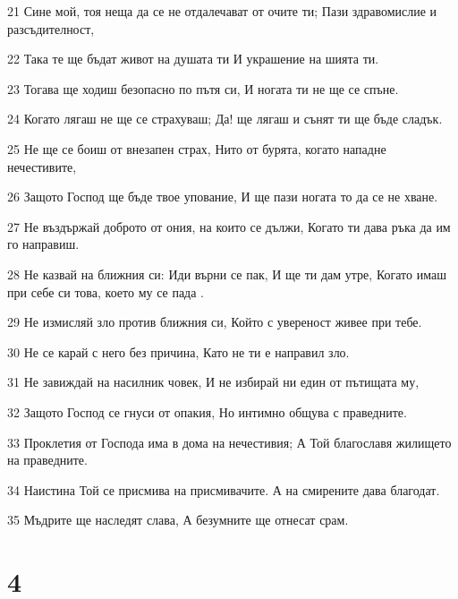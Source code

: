\par 21 Сине мой, тоя неща да се не отдалечават от очите ти; Пази здравомислие и разсъдителност,
\par 22 Така те ще бъдат живот на душата ти И украшение на шията ти.
\par 23 Тогава ще ходиш безопасно по пътя си, И ногата ти не ще се спъне.
\par 24 Когато лягаш не ще се страхуваш; Да! ще лягаш и сънят ти ще бъде сладък.
\par 25 Не ще се боиш от внезапен страх, Нито от бурята, когато нападне нечестивите,
\par 26 Защото Господ ще бъде твое упование, И ще пази ногата то да се не хване.
\par 27 Не въздържай доброто от ония, на които се дължи, Когато ти дава ръка да им го направиш.
\par 28 Не казвай на ближния си: Иди върни се пак, И ще ти дам утре, Когато имаш при себе си това, което му се пада .
\par 29 Не измисляй зло против ближния си, Който с увереност живее при тебе.
\par 30 Не се карай с него без причина, Като не ти е направил зло.
\par 31 Не завиждай на насилник човек, И не избирай ни един от пътищата му,
\par 32 Защото Господ се гнуси от опакия, Но интимно общува с праведните.
\par 33 Проклетия от Господа има в дома на нечестивия; А Той благославя жилището на праведните.
\par 34 Наистина Той се присмива на присмивачите. А на смирените дава благодат.
\par 35 Мъдрите ще наследят слава, А безумните ще отнесат срам.

\chapter{4}


